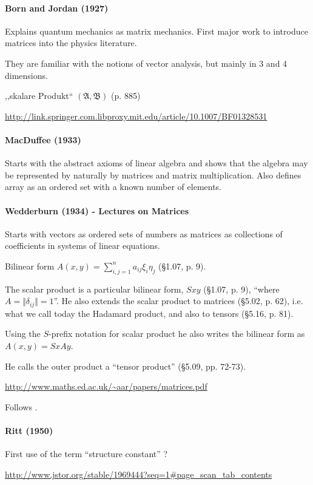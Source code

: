 \paragraph{Born and Jordan (1927)}

Explains quantum mechanics as matrix mechanics. First major work to introduce matrices into the physics literature.

They are familiar with the notions of vector analysis, but mainly in 3 and 4 dimensions.

,,skalare Produkt`` $(\mathfrak A, \mathfrak B)$ (p. 885)

\url{http://link.springer.com.libproxy.mit.edu/article/10.1007/BF01328531}


\paragraph{MacDuffee (1933)~\cite{MacDuffee1933}}

Starts with the abstract axioms of linear algebra and shows that the algebra may be represented by naturally by matrices and matrix multiplication. Also defines array as an ordered set with a known number of elements.

\paragraph{Wedderburn (1934) - Lectures on Matrices}

Starts with vectors as ordered sets of numbers as matrices as collections of coefficients in systems of linear equations.

Bilinear form $A(x, y) = \sum^n_{i,j=1} a_{ij} \xi_i \eta_j $ (\S 1.07, p. 9).

The scalar product is a particular bilinear form, $S x y$ (\S 1.07, p. 9), ``where $A = \Vert \delta_{ij} \Vert = 1$''. He also extends the scalar product to matrices (\S 5.02, p. 62), i.e. what we call today the Hadamard product, and also to tensors (\S 5.16, p. 81).

Using the $S$-prefix notation for scalar product he also writes the bilinear form as $A(x, y) = SxAy$.

He calls the outer product a ``tensor product'' (\S 5.09, pp. 72-73).





\url{http://www.maths.ed.ac.uk/~aar/papers/matrices.pdf}


Follows \cite{Scheffers1889}.

\paragraph{Ritt (1950)}

First use of the term ``structure constant'' ?

\url{http://www.jstor.org/stable/1969444?seq=1#page_scan_tab_contents}
